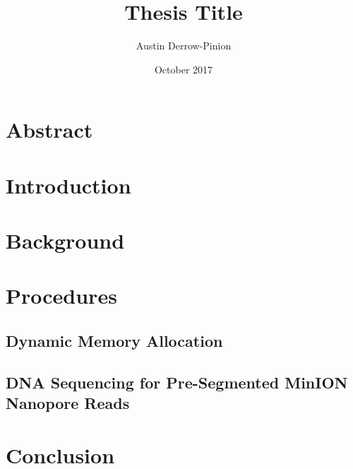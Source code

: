 \documentclass[12pt]{report}
\title{Thesis Title}
\author{Austin Derrow-Pinion}
\date{October 2017}
\begin{document}


\chapter*{Abstract}


\tableofcontents

\chapter{Introduction}


\chapter{Background}


\chapter{Procedures}
\section{Dynamic Memory Allocation}


\section{DNA Sequencing for Pre-Segmented MinION Nanopore Reads}


% 

\chapter{Conclusion}


% 

\printbibliography
\end{document}
